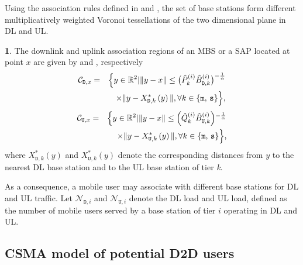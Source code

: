 \documentclass[twocolumn,english]{IEEEtran}
\theoremstyle{plain}
\theoremstyle{definition}
\newtheorem{defn}[thm]{\protect\definitionname}
\providecommand{\definitionname}{Definition}
\begin{document}
Using the association rules defined in 
and , the set of base stations form different
multiplicatively weighted Voronoi tessellations of the two dimensional
plane in DL and UL.
\begin{defn}
The downlink and uplink association regions of an MBS or a SAP located
at point $x$ are given by  and ,
respectively \cite{OIHN}
\begin{eqnarray}
\mathcal{C}_{\mathtt{D},x} & = & \Bigl\{ y\in\mathbb{R}^{2}|\Vert y-x\Vert\leq\bigl(\hat{P}_{k}^{(i)}\hat{B}_{\mathtt{D},k}^{(i)}\bigr)^{-\frac{1}{\alpha}}\nonumber \\
 &  & \times\Vert y-X_{\mathtt{D},k}^{*}\left(y\right)\Vert,\forall k\in\{\mathtt{m},\,\mathtt{s}\}\Bigr\},\label{eq:(4)}
\end{eqnarray}
\begin{eqnarray}
\mathcal{C}_{\mathtt{U},x} & = & \Bigl\{ y\in\mathbb{R}^{2}|\Vert y-x\Vert\leq\Bigl(\hat{Q}_{k}^{(i)}\hat{B}_{\mathtt{U},k}^{(i)}\Bigr){}^{-\frac{1}{\alpha}}\nonumber \\
 &  & \times\Vert y-X_{\mathtt{U},k}^{*}\left(y\right)\Vert,\forall k\in\{\mathtt{m},\,\mathtt{s}\}\Bigr\},\label{eq:(5)}
\end{eqnarray}
where $X_{\mathtt{D},k}^{*}\left(y\right)$ and $X_{\mathtt{U},k}^{*}\left(y\right)$
denote the corresponding distances from $y$ to the nearest DL base
station and to the UL base station of tier \emph{k}.
\end{defn}
As a consequence, a mobile user may associate with different base
stations for DL and UL traffic. Let\textbf{ $\mathcal{N}_{\mathtt{D},i}$}
and\textbf{ $\mathcal{N}_{\mathtt{U},i}$} denote the DL load and
UL load, defined as the number of mobile users served by a base station
of tier $i$ operating in DL and UL.


\subsection{CSMA model of potential D2D users}
\end{document}
